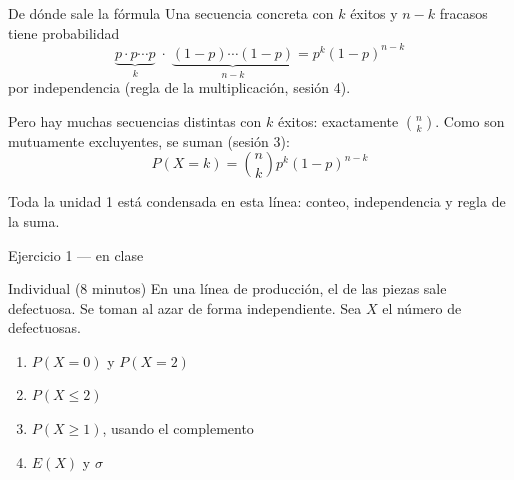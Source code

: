 \documentclass[aspectratio=169,10pt]{beamer}
\begin{document}
\begin{frame}{De dónde sale la fórmula}
  \small
  Una secuencia concreta con $k$ éxitos y $n-k$ fracasos tiene probabilidad
  \[ \underbrace{p\cdot p\cdots p}_{k}\;\cdot\;
     \underbrace{(1-p)\cdots(1-p)}_{n-k} = p^{k}(1-p)^{n-k} \]
  por independencia (regla de la multiplicación, sesión 4).

  \vspace{0.2cm}
  Pero hay muchas secuencias distintas con $k$ éxitos: exactamente
  $\binom{n}{k}$. Como son mutuamente excluyentes, se suman (sesión 3):
  \[ P(X=k)=\binom{n}{k}p^{k}(1-p)^{n-k} \]

  \vspace{0.15cm}
  {\footnotesize\color{uniGris} Toda la unidad 1 está condensada en esta línea:
  conteo, independencia y regla de la suma.}
\end{frame}

\begin{frame}{Ejercicio 1 — en clase}
  \begin{alertblock}{Individual (8 minutos)}
    En una línea de producción, el  de las piezas sale
    defectuosa. Se toman  al azar de forma independiente.
    Sea $X$ el número de defectuosas.

    \vspace{0.25cm}
    \begin{enumerate}
      \item $P(X=0)$ y $P(X=2)$
      \item $P(X\le 2)$
      \item $P(X\ge 1)$, usando el complemento
      \item $E(X)$ y $\sigma$
    \end{enumerate}
  \end{alertblock}
\end{frame}
\end{document}
